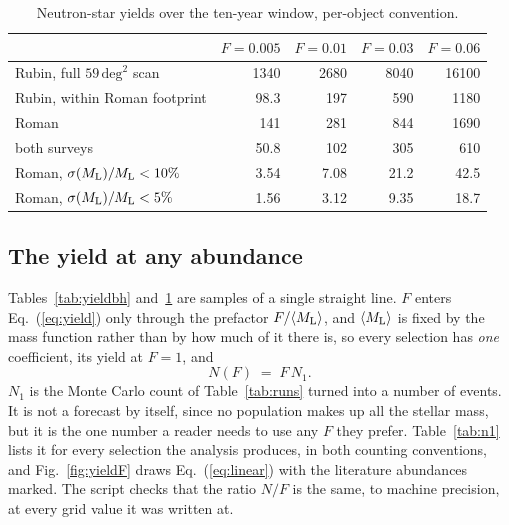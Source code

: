 \documentclass[english,10pt,a4paper]{article}
\newcommand{\Ml}{M_{\rm L}}
\begin{document}
\begin{table}[h]
\centering
\caption{Neutron-star yields over the ten-year window, per-object convention.}
\label{tab:yieldns}
\begin{tabular}{lrrrr}
\toprule
 & $F=0.005$ & $F=0.01$ & $F=0.03$ & $F=0.06$ \\
\midrule
Rubin, full $59\,\mathrm{deg}^2$ scan & 1340 & 2680 & 8040 & 16100 \\
Rubin, within Roman footprint         & 98.3 & 197  & 590  & 1180  \\
Roman                                 & 141  & 281  & 844  & 1690  \\
both surveys                          & 50.8 & 102  & 305  & 610   \\
Roman, $\sigma(\Ml)/\Ml<10\%$         & 3.54 & 7.08 & 21.2 & 42.5  \\
Roman, $\sigma(\Ml)/\Ml<5\%$          & 1.56 & 3.12 & 9.35 & 18.7  \\
\bottomrule
\end{tabular}
\end{table}

\subsection{The yield at any abundance}
\label{sec:yieldF}

Tables~\ref{tab:yieldbh} and~\ref{tab:yieldns} are samples of a single straight line. $F$ enters
Eq.~(\ref{eq:yield}) only through the prefactor $F/\langle\Ml\rangle$, and $\langle\Ml\rangle$ is
fixed by the mass function rather than by how much of it there is, so every selection has
\emph{one} coefficient, its yield at $F=1$, and
\begin{equation}
N(F) \;=\; F\,N_1 .
\label{eq:linear}
\end{equation}
$N_1$ is the Monte Carlo count of Table~\ref{tab:runs} turned into a number of events. It is not a
forecast by itself, since no population makes up all the stellar mass, but it is the one number
a reader needs to use any $F$ they prefer. Table~\ref{tab:n1} lists it for every selection the
analysis produces, in both counting conventions, and Fig.~\ref{fig:yieldF} draws
Eq.~(\ref{eq:linear}) with the literature abundances marked. The script checks that the ratio
$N/F$ is the same, to machine precision, at every grid value it was written at.
\end{document}
